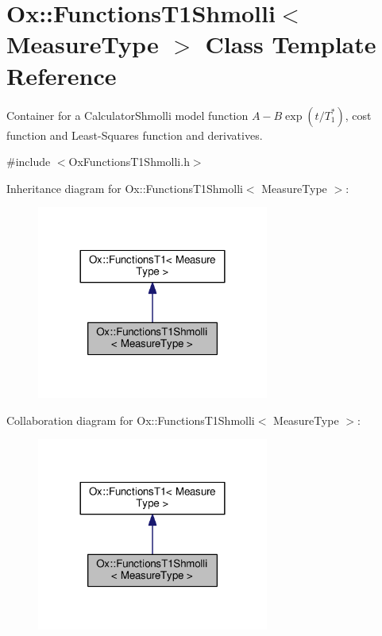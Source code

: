 \hypertarget{class_ox_1_1_functions_t1_shmolli}{\section{Ox\-:\-:Functions\-T1\-Shmolli$<$ Measure\-Type $>$ Class Template Reference}
\label{class_ox_1_1_functions_t1_shmolli}
}


Container for a Calculator\-Shmolli model function $ A-B\exp(t/T_1^*) $, cost function and Least-\/\-Squares function and derivatives.  




{\ttfamily \#include $<$Ox\-Functions\-T1\-Shmolli.\-h$>$}



Inheritance diagram for Ox\-:\-:Functions\-T1\-Shmolli$<$ Measure\-Type $>$\-:
\nopagebreak
\begin{figure}[H]
\begin{center}
\leavevmode
\includegraphics[width=216pt]{class_ox_1_1_functions_t1_shmolli__inherit__graph}
\end{center}
\end{figure}


Collaboration diagram for Ox\-:\-:Functions\-T1\-Shmolli$<$ Measure\-Type $>$\-:
\nopagebreak
\begin{figure}[H]
\begin{center}
\leavevmode
\includegraphics[width=216pt]{class_ox_1_1_functions_t1_shmolli__coll__graph}
\end{center}
\end{figure}
